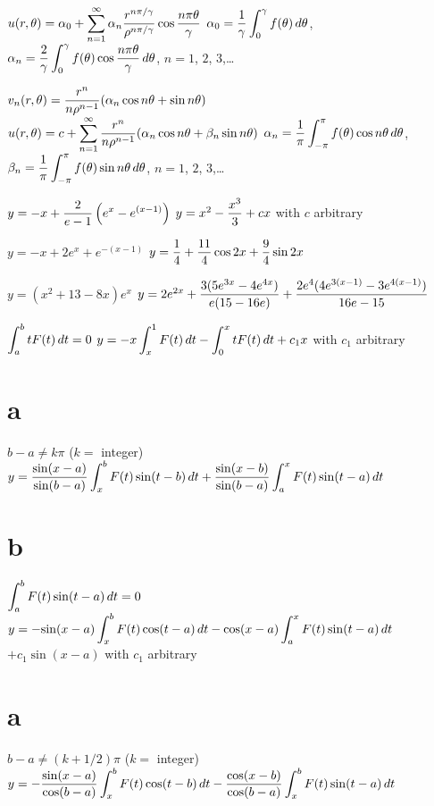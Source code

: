 $\displaystyle{u(r,\theta)=\alpha_0+\sum_{n=1}^\infty\alpha_n
\displaystyle\frac{r^{n\pi/\gamma}}{\rho^{n\pi/\gamma}}\cos\frac{n\pi\theta}{\gamma}}$
\quad
$\alpha_0=\displaystyle\frac{1}{\gamma}\int_0^\gamma f(\theta)\,d\theta$,
$\alpha_n=\displaystyle\frac{2}{\gamma}\int_0^\gamma
f(\theta)\cos\frac{n\pi\theta}{\gamma}\,d\theta$,\;
 $n=1$, $2$, $3$,\dots

$\displaystyle{
v_n(r,\theta)=\frac{r^n}{n\rho^{n-1}}(\alpha_n\cos
n\theta+\sin n\theta)}$
$u(r,\theta)=\displaystyle{
c+\sum_{n=1}^\infty\frac{r^n}{n\rho^{n-1}}(\alpha_n\cos
n\theta+\beta_n\sin n\theta)}$
$\alpha_n=\displaystyle{\frac{1}{\pi}\int_{-\pi}^\pi f(\theta)\cos
n\theta\,d\theta}$,
$\displaystyle{\beta_n=\frac{1}{\pi}\int_{-\pi}^\pi f(\theta)\sin
n\theta\,d\theta}$, $n=1$, $2$, $3$,\dots



 $y=-x+\displaystyle{\frac{2}{e-1}\left(e^{x}-e^{(x-1)}\right)}$\;
 $y=x^{2}-\displaystyle{\frac{x^{3}}{3}}+cx$ with $c$ arbitrary

$y=-x+2e^{x}+e^{-(x-1)}$\;
 $y= \displaystyle{\frac{1}{4}+\frac{11}{4}\cos2x+\frac{9}{4}\sin2x}$

  $y=(x^2+13-8x)e^{x}$\;
  $y=2e^{2x}+\displaystyle{\frac{3(5e^{3x}-4e^{4x})}{e(15-16e)}
+\frac{2e^{4}(4e^{3(x-1)}-3e^{4(x-1)})}{16e-15}}$

 $\displaystyle{\int_{a}^{b}tF(t)\,dt=0}$\;
$y=\displaystyle{-x\int_{x}^{1}F(t)\,dt-\int_{0}^{x}tF(t)\,dt+c_{1}x}$ with $c_{1}$
arbitrary

\smallskip
{} \part{a}\;   $b-a\ne k\pi$\;    ($k=$ integer)
$y=\displaystyle{\frac{\sin(x-a)}{\sin(b-a)}\int_{x}^{b}F(t)\sin(t-b)\,dt
+\frac{\sin(x-b)}{\sin(b-a)}\int_{a}^{x}F(t)\sin(t-a)\,dt}$
\part{b}\;    $\displaystyle{\int_{a}^{b}F(t)\sin(t-a)\,dt=0}$
$y=-\displaystyle{\sin(x-a)\int_{x}^{b}F(t)\cos(t-a)\,dt
-\cos(x-a)\int_{a}^{x}F(t)\sin(t-a)\,dt}$
$+c_{1}\sin(x-a)$ with  $c_{1}$ arbitrary

 \part{a}\;    $b-a\ne(k+1/2)\pi$\;    ($k=$ integer)
$y=-\displaystyle{ \frac{\sin(x-a)}{\cos(b-a)}\int_{x}^{b}F(t)\cos(t-b)\,dt-
 \frac{\cos(x-b)}{\cos(b-a)}\int_{x}^{b}F(t)\sin(t-a)\,dt}$
